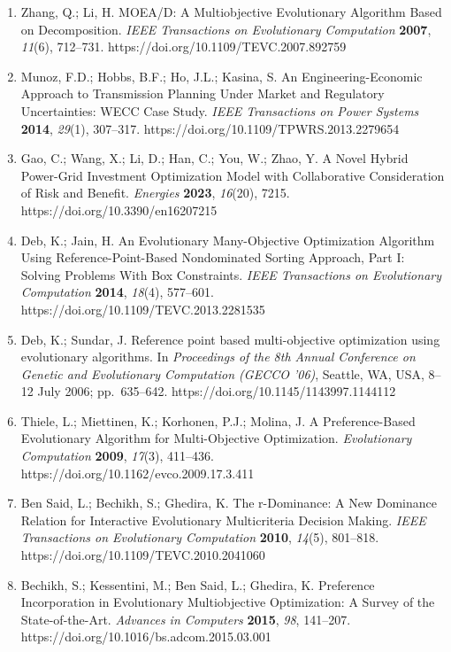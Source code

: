 \documentclass[
  10pt,
  a4paper,
]{article}
\begin{document}
\begin{enumerate}
  https://doi.org/10.1109/4235.996017
\item
  Zhang, Q.; Li, H. MOEA/D: A Multiobjective Evolutionary Algorithm
  Based on Decomposition. \emph{IEEE Transactions on Evolutionary
  Computation} \textbf{2007}, \emph{11}(6), 712--731.
  https://doi.org/10.1109/TEVC.2007.892759
\item
  Munoz, F.D.; Hobbs, B.F.; Ho, J.L.; Kasina, S. An Engineering-Economic
  Approach to Transmission Planning Under Market and Regulatory
  Uncertainties: WECC Case Study. \emph{IEEE Transactions on Power
  Systems} \textbf{2014}, \emph{29}(1), 307--317.
  https://doi.org/10.1109/TPWRS.2013.2279654
\item
  Gao, C.; Wang, X.; Li, D.; Han, C.; You, W.; Zhao, Y. A Novel Hybrid
  Power-Grid Investment Optimization Model with Collaborative
  Consideration of Risk and Benefit. \emph{Energies} \textbf{2023},
  \emph{16}(20), 7215. https://doi.org/10.3390/en16207215
\item
  Deb, K.; Jain, H. An Evolutionary Many-Objective Optimization
  Algorithm Using Reference-Point-Based Nondominated Sorting Approach,
  Part I: Solving Problems With Box Constraints. \emph{IEEE Transactions
  on Evolutionary Computation} \textbf{2014}, \emph{18}(4), 577--601.
  https://doi.org/10.1109/TEVC.2013.2281535
\item
  Deb, K.; Sundar, J. Reference point based multi-objective optimization
  using evolutionary algorithms. In \emph{Proceedings of the 8th Annual
  Conference on Genetic and Evolutionary Computation (GECCO '06)},
  Seattle, WA, USA, 8--12 July 2006; pp.~635--642.
  https://doi.org/10.1145/1143997.1144112
\item
  Thiele, L.; Miettinen, K.; Korhonen, P.J.; Molina, J. A
  Preference-Based Evolutionary Algorithm for Multi-Objective
  Optimization. \emph{Evolutionary Computation} \textbf{2009},
  \emph{17}(3), 411--436. https://doi.org/10.1162/evco.2009.17.3.411
\item
  Ben Said, L.; Bechikh, S.; Ghedira, K. The r-Dominance: A New
  Dominance Relation for Interactive Evolutionary Multicriteria Decision
  Making. \emph{IEEE Transactions on Evolutionary Computation}
  \textbf{2010}, \emph{14}(5), 801--818.
  https://doi.org/10.1109/TEVC.2010.2041060
\item
  Bechikh, S.; Kessentini, M.; Ben Said, L.; Ghedira, K. Preference
  Incorporation in Evolutionary Multiobjective Optimization: A Survey of
  the State-of-the-Art. \emph{Advances in Computers} \textbf{2015},
  \emph{98}, 141--207. https://doi.org/10.1016/bs.adcom.2015.03.001

\end{enumerate}
\end{document}
